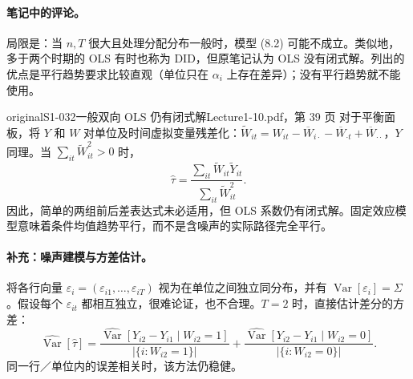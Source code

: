 \paragraph{笔记中的评论。}
局限是：当 $n,T$ 很大且处理分配分布一般时，模型 (8.2) 可能不成立。类似地，多于两个时期的 OLS 有时也称为 DID，但原笔记认为 OLS 没有闭式解。列出的优点是平行趋势要求比较直观（单位只在 $\alpha_i$ 上存在差异）；没有平行趋势就不能使用。
\begin{reviewnote}{original}{S1-032}{一般双向 OLS 仍有闭式解}{Lecture1-10.pdf，第 39 页}
对于平衡面板，将 $Y$ 和 $W$ 对单位及时间虚拟变量残差化：$\widetilde W_{it}=W_{it}-\overline W_{i\cdot}-\overline W_{\cdot t}+\overline W_{\cdot\cdot}$，$Y$ 同理。当 $\sum_{it}\widetilde W_{it}^2>0$ 时，
\[
\widehat\tau=\frac{\sum_{it}\widetilde W_{it}\widetilde Y_{it}}{\sum_{it}\widetilde W_{it}^2}.
\]
因此，简单的两组前后差表达式未必适用，但 OLS 系数仍有闭式解。固定效应模型意味着条件均值趋势平行，而不是含噪声的实际路径完全平行。
\end{reviewnote}


\paragraph{补充：噪声建模与方差估计。}
将各行向量 $\varepsilon_i=(\varepsilon_{i1},\ldots,\varepsilon_{iT})$ 视为在单位之间独立同分布，并有 $\operatorname{Var}[\varepsilon_i]=\Sigma$。假设每个 $\varepsilon_{it}$ 都相互独立，很难论证，也不合理。$T=2$ 时，直接估计差分的方差：
\[
\widehat{\operatorname{Var}}[\widehat\tau]
=\frac{\widehat{\operatorname{Var}}[Y_{i2}-Y_{i1}\mid W_{i2}=1]}{|\{i:W_{i2}=1\}|}
+\frac{\widehat{\operatorname{Var}}[Y_{i2}-Y_{i1}\mid W_{i2}=0]}{|\{i:W_{i2}=0\}|}.
\tag{原笔记 8.4}
\]
同一行／单位内的误差相关时，该方法仍稳健。
